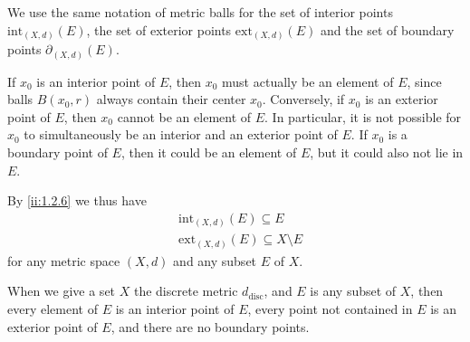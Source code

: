 \begin{note}
  We use the same notation of metric balls for the set of interior points \(\text{int}_{(X, d)}(E)\), the set of exterior points \(\text{ext}_{(X, d)}(E)\) and the set of boundary points \(\partial_{(X, d)}(E)\).
\end{note}

\begin{rmk}\label{ii:1.2.6}
  If \(x_0\) is an interior point of \(E\), then \(x_0\) must actually be an element of \(E\), since balls \(B(x_0, r)\) always contain their center \(x_0\).
  Conversely, if \(x_0\) is an exterior point of \(E\), then \(x_0\) cannot be an element of \(E\).
  In particular, it is not possible for \(x_0\) to simultaneously be an interior and an exterior point of \(E\).
  If \(x_0\) is a boundary point of \(E\), then it could be an element of \(E\), but it could also not lie in \(E\).
\end{rmk}

\begin{note}
  By \cref{ii:1.2.6} we thus have
  \begin{align*}
     & \text{int}_{(X, d)}(E) \subseteq E             \\
     & \text{ext}_{(X, d)}(E) \subseteq X \setminus E
  \end{align*}
  for any metric space \((X, d)\) and any subset \(E\) of \(X\).
\end{note}

\setcounter{thm}{7}
\begin{eg}\label{ii:1.2.8}
  When we give a set \(X\) the discrete metric \(d_{\text{disc}}\), and \(E\) is any subset of \(X\), then every element of \(E\) is an interior point of \(E\), every point not contained in \(E\) is an exterior point of \(E\), and there are no boundary points.
\end{eg}

